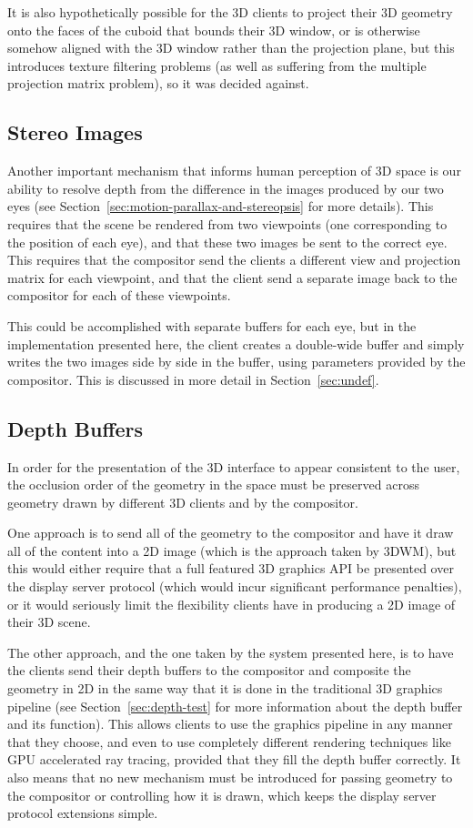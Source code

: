 It is also hypothetically possible for the 3D clients to project their 3D geometry onto the faces of the cuboid that bounds their 3D window, or is otherwise somehow aligned with the 3D window rather than the projection plane, but this introduces texture filtering problems (as well as suffering from the multiple projection matrix problem), so it was decided against.

\subsection{Stereo Images}
Another important mechanism that informs human perception of 3D space is our ability to resolve depth from the difference in the images produced by our two eyes (see Section~\ref{sec:motion-parallax-and-stereopsis} for more details). This requires that the scene be rendered from two viewpoints (one corresponding to the position of each eye), and that these two images be sent to the correct eye. This requires that the compositor send the clients a different view and projection matrix for each viewpoint, and that the client send a separate image back to the compositor for each of these viewpoints. 

This could be accomplished with separate buffers for each eye, but in the implementation presented here, the client creates a double-wide buffer and simply writes the two images side by side in the buffer, using parameters provided by the compositor. This is discussed in more detail in Section~\ref{sec:undef}.

\subsection{Depth Buffers}

In order for the presentation of the 3D interface to appear consistent to the user, the occlusion order of the geometry in the space must be preserved across geometry drawn by different 3D clients and by the compositor. 

One approach is to send all of the geometry to the compositor and have it draw all of the content into a 2D image (which is the approach taken by 3DWM), but this would either require that a full featured 3D graphics API be presented over the display server protocol (which would incur significant performance penalties), or it would seriously limit the flexibility clients have in producing a 2D image of their 3D scene.

The other approach, and the one taken by the system presented here, is to have the clients send their depth buffers to the compositor and composite the geometry in 2D in the same way that it is done in the traditional 3D graphics pipeline (see Section~\ref{sec:depth-test} for more information about the depth buffer and its function). This allows clients to use the graphics pipeline in any manner that they choose, and even to use completely different rendering techniques like GPU accelerated ray tracing, provided that they fill the depth buffer correctly. It also means that no new mechanism must be introduced for passing geometry to the compositor or controlling how it is drawn, which keeps the display server protocol extensions simple.

